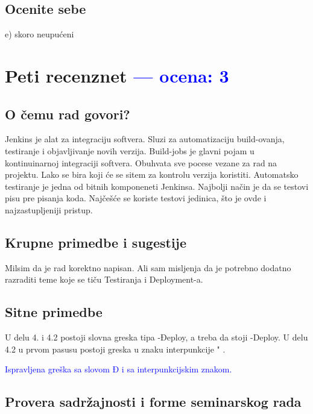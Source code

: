 \documentclass[a4paper]{report}
\newcommand{\odgovor}[1]{\textcolor{blue}{#1}}
\begin{document}
\section{Ocenite sebe}
 e) skoro neupućeni

\chapter{Peti recenznet \odgovor{--- ocena: 3}}
\section{O čemu rad govori?}
Jenkins je alat za integraciju softvera. Sluzi za automatizaciju build-ovanja, testiranje i objavljivanje novih verzija. Build-jobs je glavni pojam u kontinuinarnoj integraciji softvera. Obuhvata sve pocese vezane za rad na projektu. Lako se bira koji će se sitem za kontrolu verzija koristiti. Automatsko testiranje je jedna od bitnih komponeneti Jenkinsa. Najbolji način je da se testovi pisu pre pisanja koda. Najčešće se koriste testovi jedinica, što je ovde i najzastupljeniji pristup.  

\section{Krupne primedbe i sugestije}
Milsim da je rad korektno napisan. Ali sam misljenja da je potrebno dodatno razraditi teme koje se tiču Testiranja i Deployment-a.  

\section{Sitne primedbe}
U delu 4. i 4.2 postoji slovna greska tipa -Đeploy, a treba da stoji -Deploy. U delu 4.2 u prvom pasusu postoji greska u znaku interpunkcije " .

\odgovor{Ispravljena greška sa slovom Đ i sa interpunkcijskim znakom.}

\section{Provera sadržajnosti i forme seminarskog rada}
\end{document}
